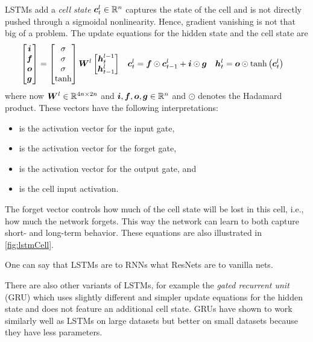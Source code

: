 		LSTMs add a \emph{cell state} \( \bm{c}_t^l \in \mathbb{R}^n \) captures the state of the cell and is not directly pushed through a sigmoidal nonlinearity. Hence, gradient vanishing is not that big of a problem. The update equations for the hidden state and the cell state are
		\begin{align}
			\begin{bmatrix}
				\bm{i} \\
				\bm{f} \\
				\bm{o} \\
				\bm{g}
			\end{bmatrix}
			&=
				\begin{bmatrix}
					\sigma \\
					\sigma \\
					\sigma \\
					\tanh
				\end{bmatrix}
				\bm{W}^l
				\begin{bmatrix}
					\bm{h}_t^{l - 1} \\
					\bm{h}_{t - 1}^l
				\end{bmatrix} &
			\bm{c}_t^l &= \bm{f} \odot \bm{c}_{t - 1}^l + \bm{i} \odot \bm{g} &
			\bm{h}_t^l &= \bm{o} \odot \tanh\big( \bm{c}_t^l \big)
		\end{align}
		where now \( \bm{W}^l \in \mathbb{R}^{4n \times 2n} \) and \( \bm{i}, \bm{f}, \bm{o}, \bm{g} \in \mathbb{R}^n \) and \( \odot \) denotes the Hadamard product. These vectors have the following interpretations:
		\begin{itemize}
			\item {} is the activation vector for the input gate,
			\item {} is the activation vector for the forget gate,
			\item {} is the activation vector for the output gate, and
			\item {} is the cell input activation.
		\end{itemize}
		The forget vector controls how much of the cell state will be lost in this cell, i.e., how much the network forgets. This way the network can learn to both capture short- and long-term behavior. These equations are also illustrated in \autoref{fig:lstmCell}.

		One can say that LSTMs are to RNNs what ResNets are to vanilla nets.

		There are also other variants of LSTMs, for example the \emph{gated recurrent unit} (GRU) which uses slightly different and simpler update equations for the hidden state and does not feature an additional cell state. GRUs have shown to work similarly well as LSTMs on large datasets but better on small datasets because they have less parameters.

